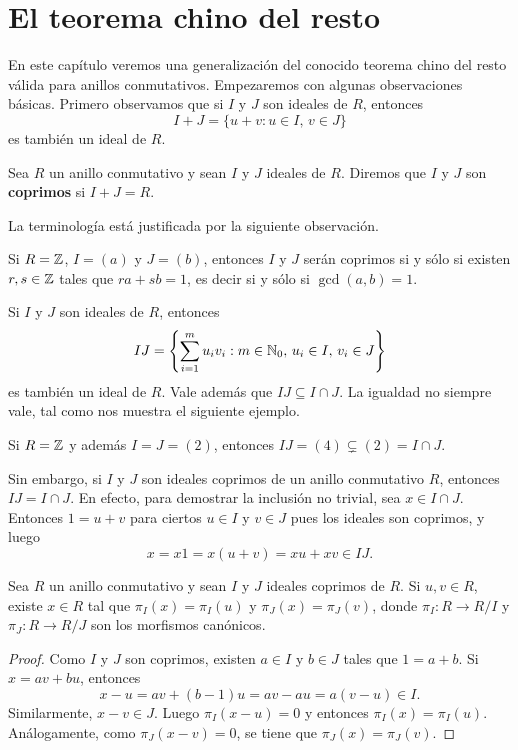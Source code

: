 \chapter{El teorema chino del resto}

En este capítulo veremos una generalización del conocido teorema chino del resto válida para anillos conmutativos. 
Empezaremos con algunas observaciones básicas. Primero observamos que
si $I$ y $J$ son ideales de $R$, entonces
\[
I+J=\{u+v:u\in I,\,v\in J\}
\]
es también un ideal de $R$. 

\begin{definition}
Sea $R$ un anillo conmutativo y sean $I$ y $J$ ideales de $R$. Diremos que $I$ y $J$ son \textbf{coprimos}
si $I+J=R$. 	
\end{definition}

La terminología está justificada por la siguiente observación.

\begin{example}
Si $R=\mathbb{Z}$, $I=(a)$ y $J=(b)$, entonces $I$ y $J$ serán coprimos si y sólo si existen $r,s\in\mathbb{Z}$ tales que $ra+sb=1$, es decir si y sólo si $\gcd(a,b)=1$. 	
\end{example}

Si $I$ y $J$ son ideales de $R$, entonces
\[
IJ=\left\{\sum_{i=1}^mu_iv_i:m\in\mathbb{N}_0,\,u_i\in I,\,v_i\in J\right\}
\]
es también un ideal de $R$. Vale además que $IJ\subseteq I\cap J$. La igualdad no siempre vale, tal como nos muestra el siguiente ejemplo.

\begin{example}
Si $R=\mathbb{Z}$ y además $I=J=(2)$, entonces $IJ=(4)\subsetneq (2)=I\cap J$. 	
\end{example}

Sin embargo, si $I$ y $J$ son ideales coprimos de un anillo conmutativo $R$, entonces $IJ=I\cap J$. En efecto, para demostrar la inclusión no trivial, 
sea $x\in I\cap J$. Entonces $1=u+v$ para ciertos $u\in I$ y $v\in J$ pues los ideales son coprimos, y luego 
\[
x=x1=x(u+v)=xu+xv\in IJ. 
\]


\begin{theorem}
Sea $R$ un anillo conmutativo y sean $I$ y $J$ ideales coprimos de $R$. Si $u,v\in R$, existe $x\in R$ tal que
$\pi_I(x)=\pi_I(u)$ y $\pi_J(x)=\pi_J(v)$, donde $\pi_I\colon R\to R/I$ y $\pi_J\colon R\to R/J$ son los morfismos canónicos. 
\end{theorem}

\begin{proof}
	Como $I$ y $J$ son coprimos, existen $a\in I$ y $b\in J$ tales que $1=a+b$. Si $x=av+bu$, entonces 
	\[
	x-u=av+(b-1)u=av-au=a(v-u)\in I.
	\]
	Similarmente, $x-v\in J$. Luego $\pi_I(x-u)=0$ y entonces $\pi_I(x)=\pi_I(u)$. Análogamente, como $\pi_J(x-v)=0$, se tiene que $\pi_J(x)=\pi_J(v)$.   
\end{proof}

